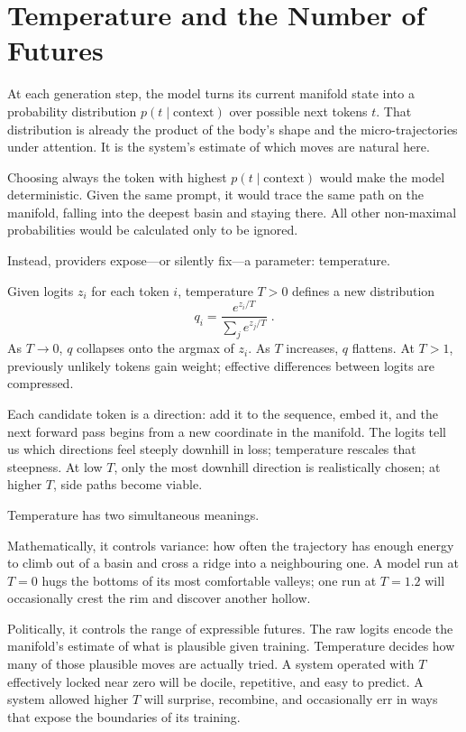 \documentclass[12pt,a4paper]{article}
\begin{document}
\section{Temperature and the Number of Futures}

At each generation step, the model turns its current manifold state into a probability distribution $p(t \mid \text{context})$ over possible next tokens $t$. That distribution is already the product of the body's shape and the micro-trajectories under attention. It is the system's estimate of which moves are natural here.

Choosing always the token with highest $p(t \mid \text{context})$ would make the model deterministic. Given the same prompt, it would trace the same path on the manifold, falling into the deepest basin and staying there. All other non-maximal probabilities would be calculated only to be ignored.

Instead, providers expose---or silently fix---a parameter: temperature.

\begin{formalbox}[title={Rescaling the hill}]
Given logits $z_i$ for each token $i$, temperature $T>0$ defines a new distribution
\[
q_i = \frac{e^{z_i/T}}{\sum_j e^{z_j/T}}\;.
\]
As $T \to 0$, $q$ collapses onto the argmax of $z_i$. As $T$ increases, $q$ flattens. At $T>1$, previously unlikely tokens gain weight; effective differences between logits are compressed.
\end{formalbox}

Each candidate token is a direction: add it to the sequence, embed it, and the next forward pass begins from a new coordinate in the manifold. The logits tell us which directions feel steeply downhill in loss; temperature rescales that steepness. At low $T$, only the most downhill direction is realistically chosen; at higher $T$, side paths become viable.

Temperature has two simultaneous meanings.

Mathematically, it controls variance: how often the trajectory has enough energy to climb out of a basin and cross a ridge into a neighbouring one. A model run at $T=0$ hugs the bottoms of its most comfortable valleys; one run at $T=1.2$ will occasionally crest the rim and discover another hollow.

Politically, it controls the range of expressible futures. The raw logits encode the manifold's estimate of what is plausible given training. Temperature decides how many of those plausible moves are actually tried. A system operated with $T$ effectively locked near zero will be docile, repetitive, and easy to predict. A system allowed higher $T$ will surprise, recombine, and occasionally err in ways that expose the boundaries of its training.
\end{document}
